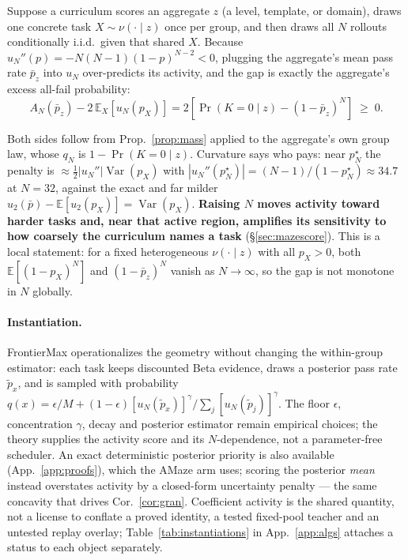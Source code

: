 \begin{corollary}
\label{cor:gran}
Suppose a curriculum scores an aggregate $z$ (a level, template, or domain),
draws one concrete task $X\sim\nu(\cdot\mid z)$ once per group, and then draws
all $N$ rollouts conditionally i.i.d.\ given that shared $X$. Because
$u_N''(p)=-N(N-1)(1-p)^{N-2}<0$, plugging the
aggregate's mean pass rate $\bar p_z$ into $u_N$ over-predicts its activity,
and the gap is exactly the aggregate's excess all-fail probability:
\[
A_N(\bar p_z)-2\,\mathbb E_X[u_N(p_X)]
=2\left[\Pr(K{=}0\mid z)-(1-\bar p_z)^N\right]\;\ge\;0 .
\]
\end{corollary}
\noindent
Both sides follow from Prop.~\ref{prop:mass} applied to the aggregate's own
group law, whose $q_N$ is $1-\Pr(K{=}0\mid z)$. Curvature says who pays: near $p^\star_N$ the penalty is
$\approx\tfrac12|u_N''|\operatorname{Var}(p_X)$ with
$|u_N''(p^\star_N)|=(N-1)/(1-p^\star_N)\approx34.7$ at $N{=}32$, against the
exact and far milder $u_2(\bar p)-\mathbb E[u_2(p_X)]=\operatorname{Var}(p_X)$.
\textbf{Raising $N$ moves activity toward harder tasks and, near that active
region, amplifies its sensitivity to how coarsely the curriculum names a task}
(\S\ref{sec:mazescore}). This is a local statement: for a fixed heterogeneous
$\nu(\cdot\mid z)$ with all $p_X>0$, both $\mathbb E[(1-p_X)^N]$ and
$(1-\bar p_z)^N$ vanish as $N\to\infty$, so the gap is not monotone in $N$
globally.



\paragraph{Instantiation.}
\label{sec:method}
FrontierMax operationalizes the geometry without changing the within-group
estimator: each task keeps discounted Beta evidence, draws a posterior pass
rate $\tilde p_x$, and is sampled with probability $q(x)=\epsilon/M+
(1-\epsilon)[u_N(\tilde p_x)]^\gamma/\sum_j[u_N(\tilde p_j)]^\gamma$. The floor
$\epsilon$, concentration $\gamma$, decay and posterior estimator remain
empirical choices; the theory supplies the activity score and its $N$-dependence, not
a parameter-free scheduler. An exact deterministic posterior priority is also
available (App.~\ref{app:proofs}), which the AMaze arm uses; scoring the
posterior \emph{mean} instead overstates activity by a closed-form uncertainty
penalty --- the same concavity that drives Cor.~\ref{cor:gran}. Coefficient
activity is the shared quantity, not a license to conflate a proved identity, a
tested fixed-pool teacher and an untested replay overlay;
Table~\ref{tab:instantiations} in App.~\ref{app:algs} attaches a status to each
object separately.

